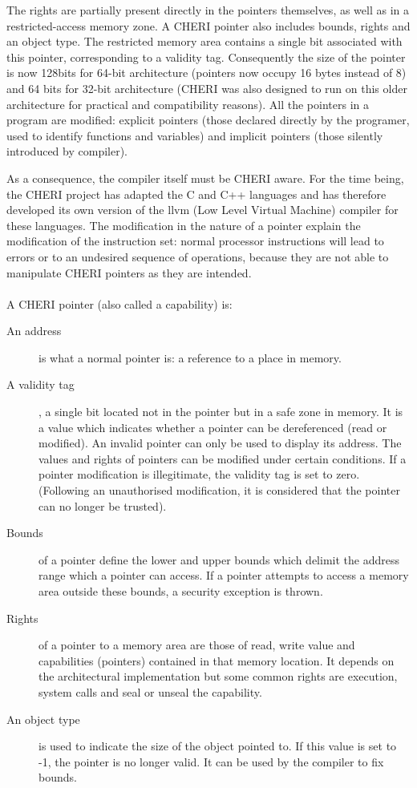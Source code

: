 \documentclass[a4paper, 11pt]{article}
\begin{document}
The rights are partially present directly in the pointers themselves, as well as in a restricted-access memory zone. A CHERI pointer also includes bounds, rights and an object type. 
The restricted memory area contains a single bit associated with this pointer, corresponding to a validity tag.
Consequently the size of the pointer is now 128bits for 64-bit architecture (pointers now occupy 16 bytes instead of 8) and 64 bits for 32-bit architecture (CHERI was also designed to run on this older architecture for practical and compatibility reasons). 
All the pointers in a program are modified: explicit pointers (those declared directly by the programer, used to identify functions and variables) and implicit pointers (those silently introduced by compiler).

As a consequence, the compiler itself must be CHERI aware. For the time being, the CHERI project has adapted the C and C++ languages and has therefore developed its own version of the \acrshort{llvm} (Low Level Virtual Machine) compiler for these languages.
The modification in the nature of a pointer explain the modification of the instruction set: normal processor instructions will lead to errors or to an undesired sequence of operations, because they are not able to manipulate CHERI pointers as they are intended. 
\\\\
A CHERI pointer (also called a capability) is:
\begin{description}
	\item[An address] is what a normal pointer is: a reference to a place in memory.
	\item[A validity tag], a single bit located not in the pointer but in a safe zone in memory. It is a value which indicates whether a pointer can be dereferenced (read or modified). An invalid pointer can only be used to display its address. The values and rights of pointers can be modified under certain conditions. If a pointer modification is illegitimate, the validity tag is set to zero. (Following an unauthorised modification, it is considered that the pointer can no longer be trusted). 
	\item[Bounds] of a pointer define the lower and upper bounds which delimit the address range which a pointer can access. If a pointer attempts to access a memory area outside these bounds, a security exception is thrown.
	\item[Rights] of a pointer to a memory area are those of read, write value and capabilities (pointers) contained in that memory location. It depends on the architectural implementation but some common rights are execution, system calls and seal or unseal the capability.
	\item[An object type] is used to indicate the size of the object pointed to. If this value is set to -1, the pointer is no longer valid. It can be used by the compiler to fix bounds.
 \end{description}
\end{document}
